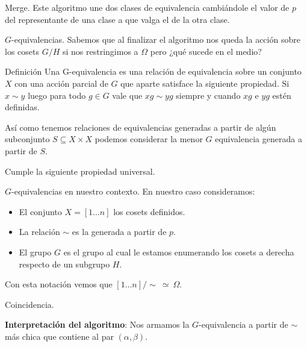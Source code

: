 \documentclass[aspectratio=169, 9pt]{beamer}
\newcommand{\In}{[1 \dots n]}
\begin{document}
\begin{frame}[fragile]{Merge.}
	Este algoritmo une dos clases de equivalencia cambiándole el valor de $p$ del representante de una clase a que valga el de la otra clase.	
\end{frame}

\begin{frame}[fragile]{$G$-equivalencias.}
	Sabemos que al finalizar el algoritmo nos queda la acción sobre los cosets $G/H$ si nos restringimos a $\Omega$ pero ¿qué sucede en el medio?
	\pause
	
	
	\begin{alertblock}{Definición}
		Una \alert{G-equivalencia} es una relación de equivalencia sobre un conjunto $X$ con una acción parcial de $G$ que aparte satisface la siguiente propiedad.
		Si $x \sim y$ luego para todo $g \in G$  vale que $xg \sim yg$ siempre y cuando $xg$ e $yg$ estén definidas.
	\end{alertblock}
	\pause
	
	
	
	Así como tenemos relaciones de equivalencias generadas a partir de algún subconjunto $S \subseteq X \times X$ podemos considerar la menor $G$ equivalencia generada a partir de $S$.
	
	
	
	\pause
	
	Cumple la siguiente propiedad universal.
	
\end{frame}

\begin{frame}[fragile]{$G$-equivalencias en nuestro contexto.}
	En nuestro caso consideramos:
	\begin{itemize}
		\item El conjunto $X = \In$ los cosets definidos.
		\pause
		\item La relación $\sim$ es la generada a partir de $p$.
		\pause
		\item El grupo $G$ es el grupo al cual le estamos enumerando los cosets a derecha respecto de un subgrupo $H$.
		\pause 
	\end{itemize}

\pause

Con esta notación vemos que $\In /\sim \ \simeq \ \Omega$.
\end{frame}

\begin{frame}[fragile]{Coincidencia.}
	
	
	\textbf{Interpretación del algoritmo}:
	Nos armamos la $G$-equivalencia a partir de $\sim$ más chica que contiene al par $(\alpha, \beta)$.
	
\end{frame}
\end{document}
